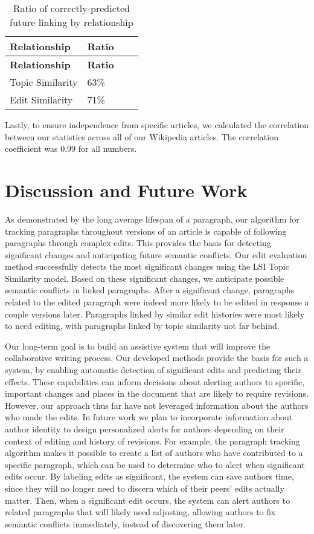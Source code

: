 \begin{longtable}[c]{@{}llll@{}}
\caption{Ratio of correctly-predicted future linking by
relationship{}}\tabularnewline
\toprule
\textbf{Relationship} & \textbf{Ratio} & &\tabularnewline
\midrule
\endfirsthead
\toprule
\textbf{Relationship} & \textbf{Ratio} & &\tabularnewline
\midrule
\endhead
Topic Similarity & 63\% & &\tabularnewline
Edit Similarity & 71\% & &\tabularnewline
\bottomrule
\end{longtable}

Lastly, to ensure independence from specific articles, we calculated the
correlation between our statistics across all of our Wikipedia articles.
The correlation coefficient was 0.99 for all numbers.

\section{Discussion and Future Work}\label{discussion-and-future-work}

As demonstrated by the long average lifespan of a paragraph, our
algorithm for tracking paragraphs throughout versions of an article is
capable of following paragraphs through complex edits. This provides the
basis for detecting significant changes and anticipating future semantic
conflicts. Our edit evaluation method successfully detects the most
significant changes using the LSI Topic Similarity model. Based on these
significant changes, we anticipate possible semantic conflicts in linked
paragraphs. After a significant change, paragraphs related to the edited
paragraph were indeed more likely to be edited in response a couple
versions later. Paragraphs linked by similar edit histories were most
likely to need editing, with paragraphs linked by topic similarity not
far behind.

Our long-term goal is to build an assistive system that will improve the
collaborative writing process. Our developed methods provide the basis
for such a system, by enabling automatic detection of significant edits
and predicting their effects. These capabilities can inform decisions
about alerting authors to specific, important changes and places in the
document that are likely to require revisions. However, our approach
thus far have not leveraged information about the authors who made the
edits. In future work we plan to incorporate information about author
identity to design personalized alerts for authors depending on their
context of editing and history of revisions. For example, the paragraph
tracking algorithm makes it possible to create a list of authors who
have contributed to a specific paragraph, which can be used to determine
who to alert when significant edits occur. By labeling edits as
significant, the system can save authors time, since they will no longer
need to discern which of their peers' edits actually matter. Then, when
a significant edit occurs, the system can alert authors to related
paragraphs that will likely need adjusting, allowing authors to fix
semantic conflicts immediately, instead of discovering them later.

